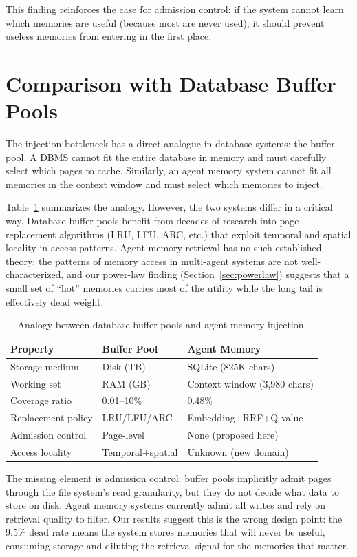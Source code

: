 \documentclass[11pt]{article}
\begin{document}
This finding reinforces the case for admission control: if the system cannot learn which memories are useful (because most are never used), it should prevent useless memories from entering in the first place.

\section{Comparison with Database Buffer Pools}
\label{sec:bufferpool}

The injection bottleneck has a direct analogue in database systems: the buffer pool. A DBMS cannot fit the entire database in memory and must carefully select which pages to cache. Similarly, an agent memory system cannot fit all memories in the context window and must select which memories to inject.

Table~\ref{tab:analogy} summarizes the analogy. However, the two systems differ in a critical way. Database buffer pools benefit from decades of research into page replacement algorithms (LRU, LFU, ARC, etc.) that exploit temporal and spatial locality in access patterns. Agent memory retrieval has no such established theory: the patterns of memory access in multi-agent systems are not well-characterized, and our power-law finding (Section~\ref{sec:powerlaw}) suggests that a small set of ``hot'' memories carries most of the utility while the long tail is effectively dead weight.

\begin{table}[h]
\centering
\caption{Analogy between database buffer pools and agent memory injection.}
\label{tab:analogy}
\begin{tabular}{lll}
\toprule
Property & Buffer Pool & Agent Memory \\
\midrule
Storage medium & Disk (TB) & SQLite (825K chars) \\
Working set & RAM (GB) & Context window (3,980 chars) \\
Coverage ratio & 0.01--10\% & 0.48\% \\
Replacement policy & LRU/LFU/ARC & Embedding+RRF+Q-value \\
Admission control & Page-level & None (proposed here) \\
Access locality & Temporal+spatial & Unknown (new domain) \\
\bottomrule
\end{tabular}
\end{table}

The missing element is admission control: buffer pools implicitly admit pages through the file system's read granularity, but they do not decide what data to store on disk. Agent memory systems currently admit all writes and rely on retrieval quality to filter. Our results suggest this is the wrong design point: the 9.5\% dead rate means the system stores memories that will never be useful, consuming storage and diluting the retrieval signal for the memories that matter.
\end{document}
